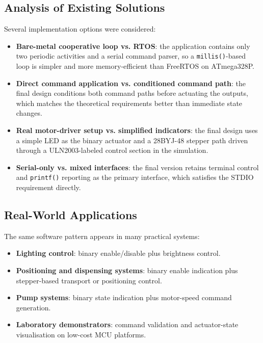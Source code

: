 \documentclass[12pt]{article}
\begin{document}
\subsection{Analysis of Existing Solutions}
\hspace{0.8cm} Several implementation options were considered:

\begin{itemize}
    \item \textbf{Bare-metal cooperative loop vs. RTOS}: the application contains only two periodic activities and a serial command parser, so a \texttt{millis()}-based loop is simpler and more memory-efficient than FreeRTOS on ATmega328P.
    \item \textbf{Direct command application vs. conditioned command path}: the final design conditions both command paths before actuating the outputs, which matches the theoretical requirements better than immediate state changes.
    \item \textbf{Real motor-driver setup vs. simplified indicators}: the final design uses a simple LED as the binary actuator and a 28BYJ-48 stepper path driven through a ULN2003-labeled control section in the simulation.
    \item \textbf{Serial-only vs. mixed interfaces}: the final version retains terminal control and \texttt{printf()} reporting as the primary interface, which satisfies the STDIO requirement directly.
\end{itemize}

\subsection{Real-World Applications}
\hspace{0.8cm} The same software pattern appears in many practical systems:

\begin{itemize}
    \item \textbf{Lighting control}: binary enable/disable plus brightness control.
    \item \textbf{Positioning and dispensing systems}: binary enable indication plus stepper-based transport or positioning control.
    \item \textbf{Pump systems}: binary state indication plus motor-speed command generation.
    \item \textbf{Laboratory demonstrators}: command validation and actuator-state visualisation on low-cost MCU platforms.
\end{itemize}
\end{document}
